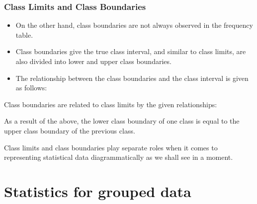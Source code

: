 \documentclass{beamer}
\begin{document}
\begin{frame}
	\frametitle{Class Limits and Class Boundaries}
	\Large
	\vspace{-1cm}
	\begin{itemize}
		\item On the other hand, class boundaries are not always observed in the frequency table.
		\item  Class boundaries give the true class interval, and similar to class limits, are also divided into lower and upper class boundaries.
		
		\item The relationship between the class boundaries and the class interval is given as follows:
	\end{itemize}
	
\end{frame}
\begin{frame}
	
	Class boundaries are related to class limits by the given relationships:
	
	
	
	
	
	As a result of the above, the lower class boundary of one class is equal to the upper class boundary of the previous class.
	
	Class limits and class boundaries play separate roles when it comes to representing statistical data diagrammatically as we shall see in a moment.
\end{frame}
\section*{Statistics for grouped data}
\end{document}

